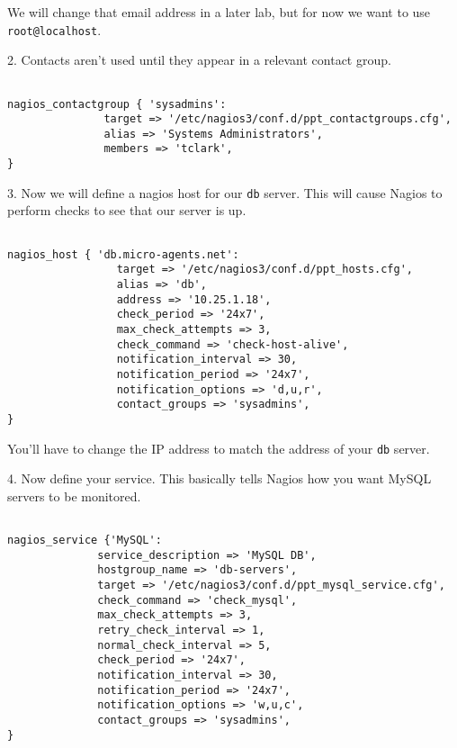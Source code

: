 \documentclass{article}         %
\begin{document}
We will change that email address in a later lab, but for now we want to use
\texttt{root@localhost}.

2. Contacts aren't used until they appear in a relevant contact group.

\begin{verbatim}

nagios_contactgroup { 'sysadmins':
               target => '/etc/nagios3/conf.d/ppt_contactgroups.cfg',
               alias => 'Systems Administrators',
               members => 'tclark', 
}

  \end{verbatim}



3. Now we will define a nagios host for our \texttt{db} server.
This will cause Nagios to perform checks to see that our server
is up.

\begin{verbatim}

nagios_host { 'db.micro-agents.net':
                 target => '/etc/nagios3/conf.d/ppt_hosts.cfg',
                 alias => 'db',
                 address => '10.25.1.18',
                 check_period => '24x7',
                 max_check_attempts => 3,
                 check_command => 'check-host-alive',
                 notification_interval => 30,
                 notification_period => '24x7',
                 notification_options => 'd,u,r',
                 contact_groups => 'sysadmins',
}
\end{verbatim}


You'll have to change the IP address to match the address of
your \texttt{db} server.

4. Now define your service.  This basically tells Nagios
how you want MySQL servers to be monitored.

\begin{verbatim}

nagios_service {'MySQL':
              service_description => 'MySQL DB',
              hostgroup_name => 'db-servers',
              target => '/etc/nagios3/conf.d/ppt_mysql_service.cfg',
              check_command => 'check_mysql',
              max_check_attempts => 3,
              retry_check_interval => 1,
              normal_check_interval => 5,
              check_period => '24x7',
              notification_interval => 30,
              notification_period => '24x7',
              notification_options => 'w,u,c',
              contact_groups => 'sysadmins',
}
\end{verbatim}
\end{document}
